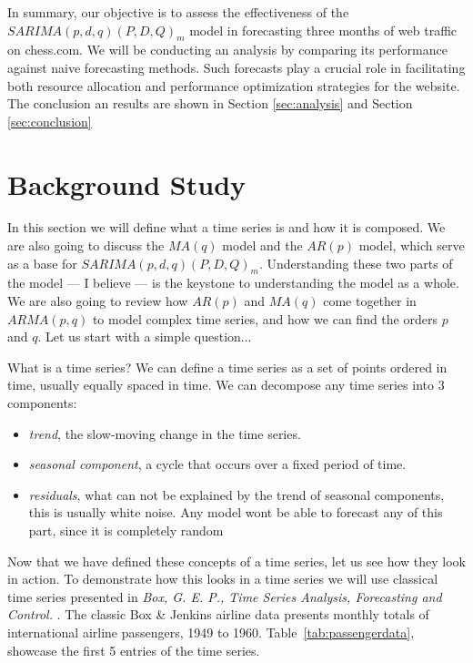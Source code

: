 \documentclass[journal]{IEEEtran}
\begin{document}
In summary, our objective is to assess the effectiveness of the
$SARIMA(p,d,q)(P,D,Q)_m$ model in forecasting three months of web traffic on
chess.com. We will be conducting an analysis by comparing its performance
against naive forecasting methods. Such forecasts play a crucial role in
facilitating both resource allocation and performance optimization strategies
for the website. The conclusion an results are shown in Section
\ref{sec:analysis} and Section \ref{sec:conclusion}


\section{Background Study}\label{sec:back}
In this section we will define what a time series is and how it is composed.
We are also going to discuss the $MA(q)$ model and the $AR(p)$ model, which
serve as a base for $SARIMA(p,d,q)(P,D,Q)_m$. Understanding these two parts
of the model --- I believe --- is the keystone to understanding the model as a
whole. We are also going to review how $AR(p)$ and $MA(q)$ come together in
$ARMA(p,q)$ to model complex time series, and how we can find the orders $p$
and $q$. Let us start with a simple question...

What is a time series? We can define a time series as a set of points ordered
in time, usually equally spaced in time. \cite{timeseries} We can decompose
any time series into 3 components:

\begin{itemize}
    \item \emph{trend}, the slow-moving change in the time series.

    \item \emph{seasonal component}, a cycle that occurs over a fixed period
        of time.

    \item \emph{residuals}, what can not be explained by the trend of seasonal
        components, this is usually white noise. Any model wont be able to
        forecast any of this part, since it is completely random
\end{itemize}

Now that we have defined these concepts of a time series, let us see how they
look in action. To demonstrate how this looks in a time series we will use
classical time series presented in \emph{Box, G. E. P., Time Series Analysis,
Forecasting and Control.} \cite{airline}. The classic Box \& Jenkins airline
data presents monthly totals of international airline passengers, 1949 to
1960. Table~\ref{tab:passengerdata}, showcase the first 5 entries of the time
series.
\end{document}
